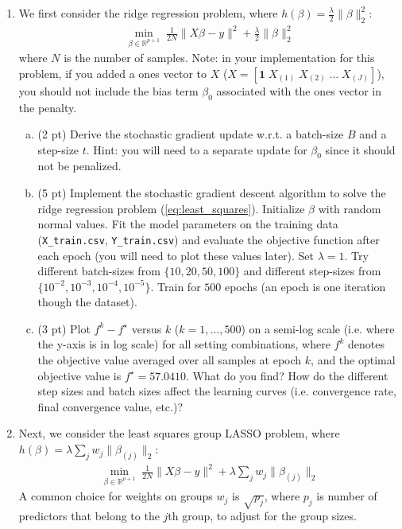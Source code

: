 \documentclass{article}
\theoremstyle{remark}
\theoremstyle{definition}
\begin{document}
\begin{enumerate}[1)]
        \item We first consider the ridge regression problem, where $h(\beta)=\frac{\lambda}{2}\|\beta\|^2_2$:
    \begin{align}
    \min_{\beta \in \mathbb{R}^{p+1}}\; \frac{1}{2N}\|X\beta-y\|^2 + \frac{\lambda}{2} \|\beta\|_2^2
    \label{eq:least_squares}
    \end{align}
    where $N$ is the number of samples.
    Note: in your implementation for this problem, if you added a ones vector to $X$ ($X = \left[ \mathbf{1}\; X_{(1)} \; X_{(2)} \; \dots \;X_{(J)} \right]$), you should not include the bias term $\beta_0$ associated with the ones vector in the penalty.

    \begin{enumerate}[(a)]
        \item (2 pt) Derive the stochastic gradient update w.r.t. a batch-size $B$ and a step-size $t$. Hint: you will need to a separate update for $\beta_0$ since it should not be penalized.

        \item (5 pt) Implement the stochastic gradient descent algorithm to solve the ridge regression
    problem (\ref{eq:least_squares}). Initialize $\beta$ with random normal values. Fit the model parameters on the training data (\texttt{X\_train.csv}, \texttt{Y\_train.csv}) and evaluate the objective function after each epoch (you will need to plot these values later). Set $\lambda=1$. Try different batch-sizes from $\{10, 20, 50, 100\}$ and different step-sizes from $\{10^{-2}, 10^{-3}, 10^{-4}, 10^{-5}\}$. Train for $500$ epochs (an epoch is one iteration though the dataset).
    
        \item (3 pt) Plot $f^{k}-f^\star$ versus $k$ ($k=1, \ldots, 500$) on a semi-log scale (i.e. where the y-axis is in log scale) for all setting combinations, where $f^{k}$ denotes the objective value averaged over all samples at epoch $k$,  and the optimal objective value is $f^\star = 57.0410$. What do you find? How do the different step sizes and batch sizes affect the learning curves (i.e. convergence rate, final convergence value, etc.)?
    \end{enumerate}
  
    
    \item Next, we consider the least squares group LASSO problem, where $h(\beta)=\lambda\sum_jw_j\|\beta_{(j)}\|_2$:
    \begin{align}
            \min_{\beta \in \mathbb{R}^{p+1}}\; \frac{1}{2N}\|X\beta-y\|^2 + \lambda \sum_j w_j\|\beta_{(j)}\|_2
    \end{align}
    A common choice for weights on
            groups $w_j$ is $\sqrt{p_j}$, where $p_j$ is number of predictors that
            belong to the $j$th group, to adjust for the group sizes.  


\end{enumerate}
\end{document}

